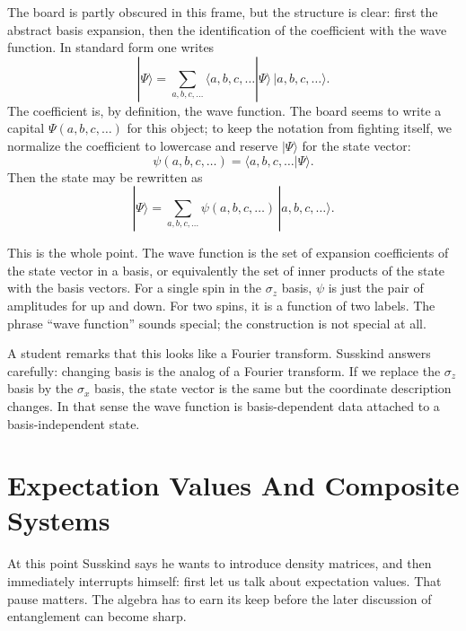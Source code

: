 The board is partly obscured in this frame, but the structure is clear: first the abstract basis expansion, then the identification of the coefficient with the wave function. In standard form one writes
\begin{equation}
|\Psi\rangle
=
\sum_{a,b,c,\ldots}
\langle a,b,c,\ldots|\Psi\rangle\,
|a,b,c,\ldots\rangle.
\end{equation}
The coefficient is, by definition, the wave function. The board seems to write a capital $\Psi(a,b,c,\ldots)$ for this object; to keep the notation from fighting itself, we normalize the coefficient to lowercase and reserve $|\Psi\rangle$ for the state vector:
\begin{equation}
\psi(a,b,c,\ldots)=\langle a,b,c,\ldots|\Psi\rangle.
\end{equation}
Then the state may be rewritten as
\begin{equation}
|\Psi\rangle
=
\sum_{a,b,c,\ldots}
\psi(a,b,c,\ldots)\,
|a,b,c,\ldots\rangle.
\end{equation}

This is the whole point. The wave function is the set of expansion coefficients of the state vector in a basis, or equivalently the set of inner products of the state with the basis vectors. For a single spin in the $\sigma_z$ basis, $\psi$ is just the pair of amplitudes for up and down. For two spins, it is a function of two labels. The phrase ``wave function'' sounds special; the construction is not special at all.

A student remarks that this looks like a Fourier transform. Susskind answers carefully: changing basis is the analog of a Fourier transform. If we replace the $\sigma_z$ basis by the $\sigma_x$ basis, the state vector is the same but the coordinate description changes. In that sense the wave function is basis-dependent data attached to a basis-independent state.

\section{Expectation Values And Composite Systems}

At this point Susskind says he wants to introduce density matrices, and then immediately interrupts himself: first let us talk about expectation values. That pause matters. The algebra has to earn its keep before the later discussion of entanglement can become sharp.

